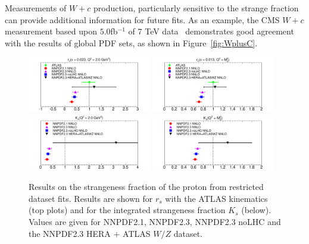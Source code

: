  Measurements of $W+c$ production, particularly sensitive to the strange fraction can provide additional information for future fits. As an example, the CMS $W+c$ measurement based upon $5.0 $fb$^{-1}$ of $7$ TeV data~\cite{Chatrchyan:2013uja} demonstrates good agreement with the results of global PDF sets, as shown in Figure~\ref{fig:WplusC}.

\begin{figure}[ht]
\centering
\includegraphics[width=0.48\textwidth]{6-LHCimpact/figs/rs-2.pdf}
\includegraphics[width=0.48\textwidth]{6-LHCimpact/figs/rs-10000.pdf}\\
\includegraphics[width=0.48\textwidth]{6-LHCimpact/figs/rs-2-int.pdf}
\includegraphics[width=0.48\textwidth]{6-LHCimpact/figs/rs-10000-int.pdf}\\
\caption[ Results on the strangeness fraction of the proton from restricted dataset fits ]{Results on the strangeness fraction of the proton from restricted dataset fits. Results are shown for $r_s$ with the ATLAS kinematics (top plots) and for the integrated strangeness fraction $K_s$ (below). Values are given for NNPDF2.1, NNPDF2.3, NNPDF2.3 noLHC and the NNPDF2.3 HERA + ATLAS $W/Z$ dataset.}
\label{fig:NNPDFrs}
\end{figure}

